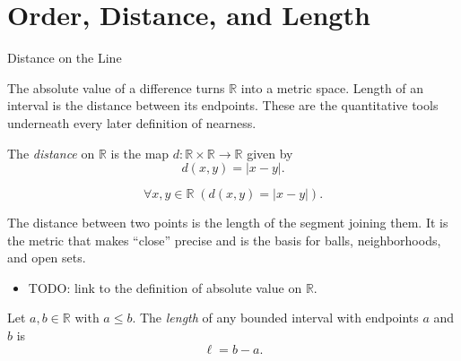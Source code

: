 \section{Order, Distance, and Length}
\label{sec:order-distance-length}

\begin{topicbox}{Distance on the Line}
\begin{exposition}
The absolute value of a difference turns $\mathbb{R}$ into a metric space. Length of an interval is the distance between its endpoints. These are the quantitative tools underneath every later definition of nearness.
\end{exposition}
\end{topicbox}
\begin{tcolorbox}[colback=defbox, colframe=defborder, arc=2pt,
  left=6pt, right=6pt, top=4pt, bottom=4pt,
  title={\small\textbf{Definition (Distance on the Real Line)}},
  fonttitle=\small\bfseries]
\begin{definition}
\label{def:distance-on-real-line}
The \emph{distance} on $\mathbb{R}$ is the map $d:\mathbb{R}\times\mathbb{R}\to\mathbb{R}$ given by
\[
d(x,y)=|x-y|.
\]
\end{definition}
\end{tcolorbox}
\begin{remark*}
\[
\forall x,y\in\mathbb{R}\;(d(x,y)=|x-y|).
\]
\end{remark*}
\begin{remark*}[Interpretation]
The distance between two points is the length of the segment joining them. It is the metric that makes ``close'' precise and is the basis for balls, neighborhoods, and open sets.
\end{remark*}
\begin{dependencies}
\begin{itemize}
  \item TODO: link to the definition of absolute value on $\mathbb{R}$.
\end{itemize}
\end{dependencies}
\begin{tcolorbox}[colback=defbox, colframe=defborder, arc=2pt,
  left=6pt, right=6pt, top=4pt, bottom=4pt,
  title={\small\textbf{Definition (Length of a Bounded Interval)}},
  fonttitle=\small\bfseries]
\begin{definition}
\label{def:length-of-interval}
Let $a,b\in\mathbb{R}$ with $a\le b$. The \emph{length} of any bounded interval with endpoints $a$ and $b$ is
\[
\ell=b-a.
\]
\end{definition}
\end{tcolorbox}
